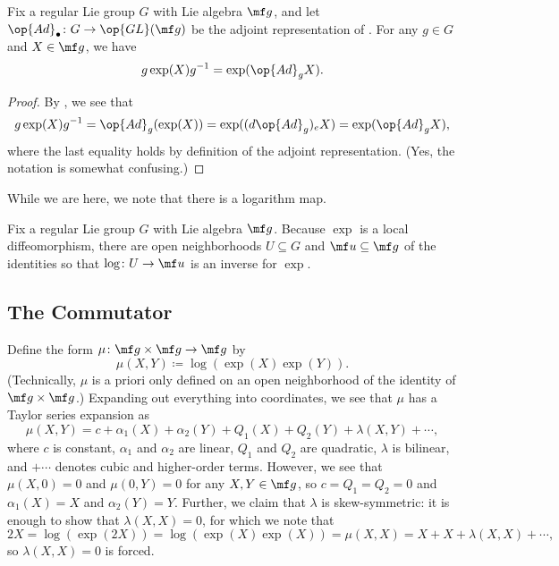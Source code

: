 \documentclass[../notes.tex]{subfiles}
\begin{document}
\begin{proposition} \label{prop:exp-adjoint}
	Fix a regular Lie group $G$ with Lie algebra $\mf g$, and let $\op{Ad}_\bullet\colon G\to\op{GL}(\mf g)$ be the adjoint representation of . For any $g\in G$ and $X\in\mf g$, we have
	\[g\exp(X)g^{-1}=\exp(\op{Ad}_gX).\]
\end{proposition}
\begin{proof}
	By , we see that
	\[g\exp(X)g^{-1}=\op{Ad}_g(\exp(X))=\exp((d{\op{Ad}_g})_eX)=\exp(\op{Ad}_gX),\]
	where the last equality holds by definition of the adjoint representation. (Yes, the notation is somewhat confusing.)
\end{proof}
While we are here, we note that there is a logarithm map.
\begin{definition}[logarithm]
	Fix a regular Lie group $G$ with Lie algebra $\mf g$. Because $\exp$ is a local diffeomorphism, there are open neighborhoods $U\subseteq G$ and $\mf u\subseteq\mf g$ of the identities so that $\log\colon U\to\mf u$ is an inverse for $\exp$.
\end{definition}

\subsection{The Commutator}
Define the form $\mu\colon\mf g\times\mf g\to\mf g$ by
\[\mu(X,Y)\coloneqq\log(\exp(X)\exp(Y)).\]
(Technically, $\mu$ is a priori only defined on an open neighborhood of the identity of $\mf g\times\mf g$.) Expanding out everything into coordinates, we see that $\mu$ has a Taylor series expansion as
\[\mu(X,Y)=c+\alpha_1(X)+\alpha_2(Y)+Q_1(X)+Q_2(Y)+\lambda(X,Y)+\cdots,\]
where $c$ is constant, $\alpha_1$ and $\alpha_2$ are linear, $Q_1$ and $Q_2$ are quadratic, $\lambda$ is bilinear, and $+\cdots$ denotes cubic and higher-order terms. However, we see that $\mu(X,0)=0$ and $\mu(0,Y)=0$ for any $X,Y\in\mf g$, so $c=Q_1=Q_2=0$ and $\alpha_1(X)=X$ and $\alpha_2(Y)=Y$. Further, we claim that $\lambda$ is skew-symmetric: it is enough to show that $\lambda(X,X)=0$, for which we note that
\[2X=\log(\exp(2X))=\log(\exp(X)\exp(X))=\mu(X,X)=X+X+\lambda(X,X)+\cdots,\]
so $\lambda(X,X)=0$ is forced.
\end{document}
